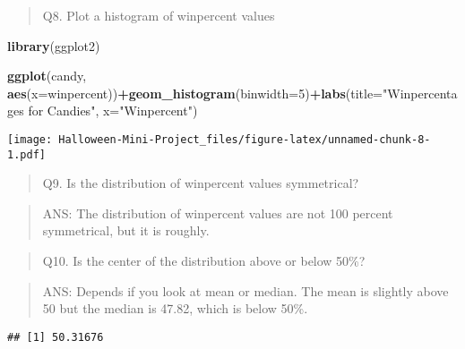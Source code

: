 \documentclass[
]{article}
\newenvironment{Shaded}{\begin{snugshade}}{\end{snugshade}}
\newcommand{\AttributeTok}[1]{\textcolor[rgb]{0.13,0.29,0.53}{#1}}
\newcommand{\DecValTok}[1]{\textcolor[rgb]{0.00,0.00,0.81}{#1}}
\newcommand{\FunctionTok}[1]{\textcolor[rgb]{0.13,0.29,0.53}{\textbf{#1}}}
\newcommand{\NormalTok}[1]{#1}
\newcommand{\SpecialCharTok}[1]{\textcolor[rgb]{0.81,0.36,0.00}{\textbf{#1}}}
\newcommand{\StringTok}[1]{\textcolor[rgb]{0.31,0.60,0.02}{#1}}
\begin{document}
\begin{quote}
Q8. Plot a histogram of winpercent values
\end{quote}

\begin{Shaded}
\begin{Highlighting}[]
\FunctionTok{library}\NormalTok{(ggplot2)}

\FunctionTok{ggplot}\NormalTok{(candy, }\FunctionTok{aes}\NormalTok{(}\AttributeTok{x=}\NormalTok{winpercent))}\SpecialCharTok{+}\FunctionTok{geom\_histogram}\NormalTok{(}\AttributeTok{binwidth=}\DecValTok{5}\NormalTok{)}\SpecialCharTok{+}\FunctionTok{labs}\NormalTok{(}\AttributeTok{title=}\StringTok{"Winpercentages for Candies"}\NormalTok{, }\AttributeTok{x=}\StringTok{"Winpercent"}\NormalTok{)}
\end{Highlighting}
\end{Shaded}

\texttt{[image: Halloween-Mini-Project\_files/figure-latex/unnamed-chunk-8-1.pdf]}

\begin{quote}
Q9. Is the distribution of winpercent values symmetrical?
\end{quote}

\begin{quote}
ANS: The distribution of winpercent values are not 100 percent
symmetrical, but it is roughly.
\end{quote}

\begin{quote}
Q10. Is the center of the distribution above or below 50\%?
\end{quote}

\begin{quote}
ANS: Depends if you look at mean or median. The mean is slightly above
50 but the median is 47.82, which is below 50\%.
\end{quote}

\begin{Shaded}
\end{Shaded}

\begin{verbatim}
## [1] 50.31676
\end{verbatim}

\begin{Shaded}
\end{Shaded}
\end{document}
